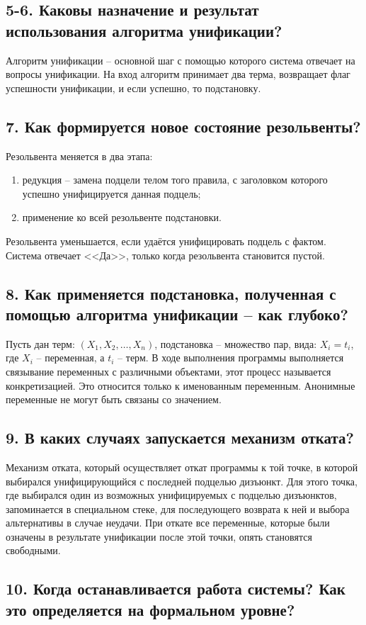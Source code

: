 \subsection*{5-6. Каковы назначение и результат использования алгоритма унификации?}

Алгоритм унификации -- основной шаг с помощью которого система отвечает на вопросы унификации. На вход алгоритм принимает два терма, возвращает флаг успешности унификации, и если успешно, то подстановку.

\subsection*{7. Как формируется новое состояние резольвенты?}

Резольвента меняется в два этапа:

\begin{enumerate}
	\item редукция -- замена подцели телом того правила, с заголовком которого успешно унифицируется данная подцель;
	
	\item применение ко всей резольвенте подстановки.
\end{enumerate}

Резольвента уменьшается, если удаётся унифицировать подцель с фактом. Система отвечает <<Да>>, только когда резольвента становится пустой.

\subsection*{8. Как применяется подстановка, полученная с помощью алгоритма унификации -- как глубоко?}

Пусть дан терм: $(X_1, X_2,\dots, X_n)$, подстановка -- множество пар, вида: ${X_i = t_i}$, где $X_i$ -- переменная, а $t_i$ -- терм. В ходе выполнения программы выполняется связывание переменных с различными объектами, этот процесс называется конкретизацией. Это относится только к именованным переменным. Анонимные переменные не могут быть связаны со значением.

\subsection*{9. В каких случаях запускается механизм отката?}

Механизм отката, который осуществляет откат программы к той точке, в которой выбирался унифицирующийся с последней подцелью дизъюнкт. Для этого точка, где выбирался один из возможных унифицируемых с подцелью дизъюнктов, запоминается в специальном стеке, для последующего возврата к ней и выбора альтернативы в случае неудачи. При откате все переменные, которые были означены в результате унификации после этой точки, опять становятся свободными.

\subsection*{10. Когда останавливается работа системы? Как это определяется на формальном уровне?}